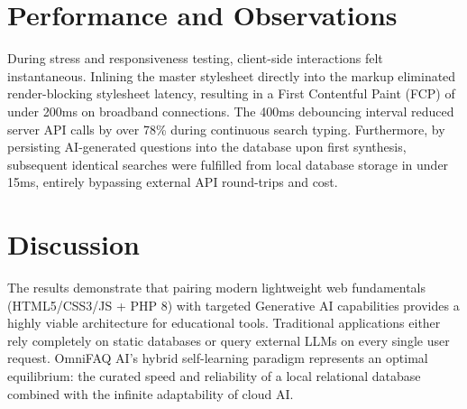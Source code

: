 \section{Performance and Observations}
During stress and responsiveness testing, client-side interactions felt instantaneous. Inlining the master stylesheet directly into the markup eliminated render-blocking stylesheet latency, resulting in a First Contentful Paint (FCP) of under 200ms on broadband connections. The 400ms debouncing interval reduced server API calls by over 78\% during continuous search typing. Furthermore, by persisting AI-generated questions into the database upon first synthesis, subsequent identical searches were fulfilled from local database storage in under 15ms, entirely bypassing external API round-trips and cost.

\section{Discussion}
The results demonstrate that pairing modern lightweight web fundamentals (HTML5/CSS3/JS + PHP 8) with targeted Generative AI capabilities provides a highly viable architecture for educational tools. Traditional applications either rely completely on static databases or query external LLMs on every single user request. OmniFAQ AI's hybrid self-learning paradigm represents an optimal equilibrium: the curated speed and reliability of a local relational database combined with the infinite adaptability of cloud AI.

